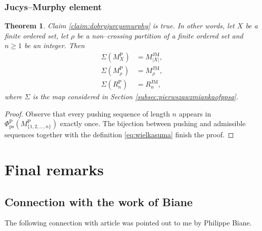 \documentclass[12pt,dvips]{amsart}
\numberwithin{equation}{section} \numberwithin{figure}{section}
\theoremstyle{plain}
\newtheorem{theorem}[lemma]{Theorem}
\theoremstyle{definition}
\theoremstyle{remark}
\newcommand{\fppps}{\Phi^{\pp}_{\ps}}
\newcommand{\MJM}{M^{\JM}}
\newcommand{\Mpp}{M^{\pp}}
\newcommand{\RJM}{R^{\JM}}
\newcommand{\Rpp}{R^{\pp}}
\DeclareMathOperator{\JM}{JM}
\DeclareMathOperator{\ps}{ps}
\DeclareMathOperator{\pp}{P}
\begin{document}
\subsubsection{Jucys--Murphy element}
\begin{theorem}
\label{theo:zgodnoscpartycjizjurcysiem} Claim
\ref{claim:dobryjurcysmurphy} is true. In other words, let $X$ be a
finite ordered set, let $\rho$ be a non--crossing partition of a
finite ordered set and $n\geq 1$ be an integer. Then \begin{align*}
 \Sigma(\Mpp_{X}) &=\MJM_{|X|}, \\
 \Sigma(\Mpp_\rho)&=\MJM_\rho, \\
 \Sigma(\Rpp_n)&=\RJM_n, \end{align*} where
$\Sigma$ is the map considered in Section
\ref{subsec:pierwszawzmiankaofppsq}.
\end{theorem}
\begin{proof}
Observe that every pushing sequence of length $n$ appears in
$\fppps(\Mpp_{\{1,2,\dots,n\}})$ exactly once. The bijection between
pushing and admissible sequences together with the definition
\eqref{eq:wielkasuma} finish the proof.
\end{proof}





\section{Final remarks}

\label{sec:randommatrices}




\subsection{Connection with the work of Biane}
\label{subsec:bianeconnection} The following connection with article
\cite{Biane1998} was pointed out to me by Philippe Biane.



\end{document}
